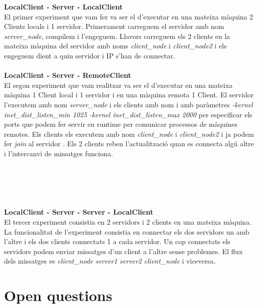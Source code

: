 \documentclass[a4paper, 10pt]{article}
\begin{document}
\begin{itemize}

\textbf{LocalClient - Server - LocalClient}\\
El primer experiment que vam fer va ser el d'executar en una mateixa màquina 2 Clients locals i 1 servidor. Primerament carreguem el servidor amb nom \textit{server\_node}, compilem i l'engeguem. Llavors carreguem els 2 clients en la mateixa màquina del servidor amb noms \textit{client\_node} i \textit{client\_node2} i els engeguem dient a quin servidor i IP s'han de connectar.\\\\

\textbf{LocalClient - Server - RemoteClient}\\
El segon experiment que vam realitzar va ser el d'executar en una mateixa màquina 1 Client local i 1 servidor i en una màquina remota 1 Client. El servidor l'executem amb nom \textit{server\_node} i els clients amb nom i amb paràmetres \textit{-kernel inet\_dist\_listen\_min 1025 -kernel inet\_dist\_listen\_max 2000} per especificar els ports que podem fer servir en runtime per comunicar processos de màquines remotes. Els clients els executem amb nom \textit{client\_node} i \textit{client\_node2} i ja podem fer \textit{join} al servidor . Els 2 clients reben l'actualització quan es connecta algú altre i l'intercanvi de missatges funciona.\\\\\\\\\\\\

\textbf{LocalClient - Server - Server - LocalClient}\\
El tercer experiment consistia en 2 servidors i 2 clients en una mateixa màquina. La funcionalitat de l'experiment consistia en connectar els dos servidors un amb l'altre i els dos clients connectats 1 a cada servidor. Un cop connectats els servidors podem enviar missatges d'un client a l'altre sense problemes. El flux dels missatges es \textit{client\_node} \rightarrow \textit{server1} \rightarrow \textit{server2} \rightarrow \textit{client\_node} i viceversa.\\

\end{itemize}

\newpage

\section{Open questions}
\end{document}

